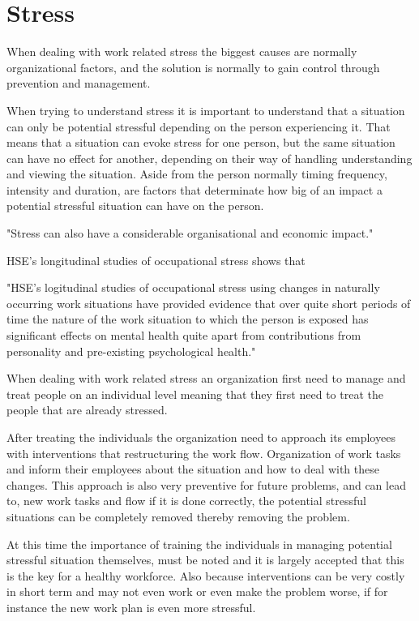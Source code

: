 \section{Stress}
When dealing with work related stress the biggest causes are normally organizational factors, and the solution is normally to gain control through prevention and management.

When trying to understand stress it is important to understand that a situation can only be potential stressful depending on the person experiencing it. That means that a situation can evoke stress for one person, but the same situation can have no effect for another, depending on their way of handling understanding and viewing the situation. Aside from the person normally timing frequency, intensity and duration, are factors that determinate how big of an impact a potential stressful situation can have on the person.

"Stress can also have a considerable organisational and economic impact."

HSE's  longitudinal studies of occupational stress shows that 

"HSE's  logitudinal studies of occupational stress using changes in naturally occurring work situations have provided evidence that over quite short periods of time the nature of the work situation to which the person is exposed has significant effects on mental health quite apart from contributions from personality and pre-existing psychological health."

When dealing with work related stress an organization first need to manage and treat people on an individual level meaning that they first need to treat the people that are already stressed\cite{control_stress_work}.

After treating the individuals the organization need to approach its employees with interventions that restructuring the work flow. Organization of work tasks and inform their employees about the situation and how to deal with these changes. This approach is also very preventive for future problems, and can lead to, new work tasks and flow if it is done correctly, the potential stressful situations can be completely removed thereby removing the problem.

At this time the importance of training the individuals in managing potential stressful situation themselves, must be noted and it is largely accepted that this is the key for a healthy workforce. Also because interventions can be very costly in short term and may not even work or even make the problem worse, if for instance the new work plan is even more stressful.

